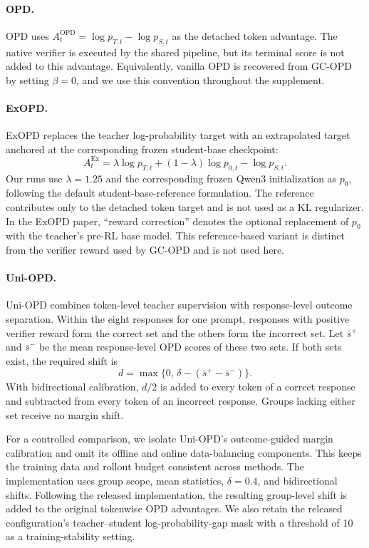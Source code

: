 \paragraph{OPD.}
OPD uses $A_t^{\mathrm{OPD}}=\log p_{T,t}-\log p_{S,t}$ as the detached token
advantage. The native verifier is executed by the shared pipeline, but its
terminal score is not added to this advantage. Equivalently, vanilla OPD is
recovered from GC-OPD by setting $\beta=0$, and we use this convention
throughout the supplement.

\paragraph{ExOPD.}
ExOPD replaces the teacher log-probability target with an extrapolated target
anchored at the corresponding frozen student-base checkpoint:
\begin{equation}
A_t^{\mathrm{Ex}}=
\lambda\log p_{T,t}+(1-\lambda)\log p_{0,t}-\log p_{S,t}.
\label{eq:exopd}
\end{equation}
Our runs use $\lambda=1.25$ and the corresponding frozen Qwen3 initialization
as $p_0$, following the default student-base-reference formulation. The
reference contributes only to the detached token target and is not used as a
KL regularizer. In the ExOPD paper, ``reward correction'' denotes the optional
replacement of $p_0$ with the teacher's pre-RL base model. This reference-based
variant is distinct from the verifier reward used by GC-OPD and is not used
here.

\paragraph{Uni-OPD.}
Uni-OPD combines token-level teacher supervision with response-level outcome
separation. Within the eight responses for one prompt, responses with positive
verifier reward form the correct set and the others form the
incorrect set. Let $\bar{s}^{+}$ and $\bar{s}^{-}$ be the mean response-level
OPD scores of these two sets. If both sets exist, the required shift is
\begin{equation}
d=\max\{0,\,\delta-(\bar{s}^{+}-\bar{s}^{-})\}.
\label{eq:uni-margin}
\end{equation}
With bidirectional calibration, $d/2$ is added to every token of a correct
response and subtracted from every token of an incorrect response. Groups
lacking either set receive no margin shift.

For a controlled comparison, we isolate Uni-OPD's outcome-guided margin
calibration and omit its offline and online data-balancing components. This
keeps the training data and rollout budget consistent across methods. The
implementation uses group scope, mean statistics, $\delta=0.4$, and
bidirectional shifts. Following the released implementation, the resulting
group-level shift is added to the original tokenwise OPD advantages. We also
retain the released configuration's teacher--student log-probability-gap mask
with a threshold of 10 as a training-stability setting.

